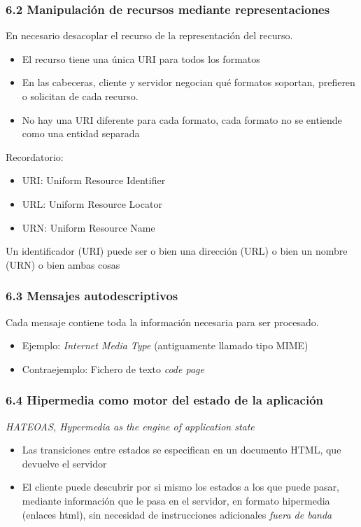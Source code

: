 \documentclass[ucs]{beamer}
\begin{document}
\begin{frame}[fragile]
\frametitle{6.2 Manipulación de recursos mediante representaciones}
En necesario desacoplar el recurso de la representación del recurso.
\begin{itemize}
\item
El recurso tiene una única URI para todos los formatos
\item
En las cabeceras, cliente y servidor negocian qué formatos soportan, prefieren
o solicitan de cada recurso.
\item
No hay una URI diferente para cada formato, cada formato no se entiende como una entidad
separada
\end{itemize}

Recordatorio:


\begin{itemize}
\item
URI: Uniform Resource Identifier
\item
URL: Uniform Resource Locator
\item
URN: Uniform Resource Name
\end{itemize}

Un identificador (URI) puede ser o bien una dirección (URL) o bien
un nombre (URN) o bien ambas cosas

\end{frame}



\begin{frame}[fragile]
\frametitle{6.3 Mensajes autodescriptivos}
Cada mensaje contiene toda la información necesaria para ser procesado.
\begin{itemize}
\item
Ejemplo: \emph{Internet Media Type} (antiguamente llamado tipo MIME)

\item
Contraejemplo: Fichero de texto \emph{code page}
\end{itemize}

\end{frame}


\begin{frame}[fragile]
\frametitle{6.4 Hipermedia como motor del estado de la aplicación }
\emph{HATEOAS, Hypermedia as the engine of application state}

\begin{itemize}
\item
Las transiciones entre estados se especifican en un documento HTML, que devuelve
el servidor
\item
El cliente puede descubrir por si mismo los estados a los que puede pasar,
mediante información que le pasa en el servidor, en formato hipermedia
(enlaces html), sin necesidad de instrucciones adicionales \emph{fuera de banda}
\end{itemize}

\end{frame}
\end{document}
